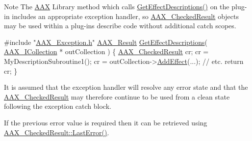 \begin{DoxyNote}{Note}
The \hyperlink{a00288}{A\+A\+X} Library method which calls {\ttfamily \hyperlink{a00326_gae0d356eef326f77cbb972e48946d4892}{Get\+Effect\+Descriptions()}} on the plug-\/in includes an appropriate exception handler, so \hyperlink{a00019}{A\+A\+X\+\_\+\+Checked\+Result} objects may be used within a plug-\/in\textquotesingle{}s describe code without additional catch scopes.
\end{DoxyNote}

\begin{DoxyCode}
\textcolor{preprocessor}{#include "\hyperlink{a00208}{AAX\_Exception.h}"}
\hyperlink{a00149_a4d8f69a697df7f70c3a8e9b8ee130d2f}{AAX\_Result} \hyperlink{a00326_gae0d356eef326f77cbb972e48946d4892}{GetEffectDescriptions}( \hyperlink{a00087}{AAX\_ICollection} * 
      outCollection )
\{
  \hyperlink{a00019}{AAX\_CheckedResult} cr;
  cr = MyDescriptionSubroutine1();
  cr = outCollection->\hyperlink{a00087_a5ff114b8c4da2081515186f2faf65c8c}{AddEffect}(...);
  \textcolor{comment}{// etc.}
  \textcolor{keywordflow}{return} cr;
\}
\end{DoxyCode}


It is assumed that the exception handler will resolve any error state and that the \hyperlink{a00019}{A\+A\+X\+\_\+\+Checked\+Result} may therefore continue to be used from a clean state following the exception catch block.

If the previous error value is required then it can be retrieved using \hyperlink{a00019_ab562025cfed2205f683deb011cbb9416}{A\+A\+X\+\_\+\+Checked\+Result\+::\+Last\+Error()}.


